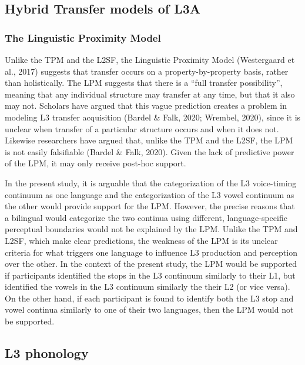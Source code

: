 \documentclass[
  man]{apa6}
\begin{document}
\hypertarget{hybrid-transfer-models-of-l3a}{%
\subsection{Hybrid Transfer models of L3A}\label{hybrid-transfer-models-of-l3a}}

\hypertarget{the-linguistic-proximity-model}{%
\subsubsection{The Linguistic Proximity Model}\label{the-linguistic-proximity-model}}

Unlike the TPM and the L2SF, the Linguistic Proximity Model (Westergaard et al., 2017) suggests that transfer occurs on a property-by-property basis, rather than holistically.
The LPM suggests that there is a ``full transfer possibility'', meaning that any individual structure may transfer at any time, but that it also may not.
Scholars have argued that this vague prediction creates a problem in modeling L3 transfer acquisition (Bardel \& Falk, 2020; Wrembel, 2020), since it is unclear when transfer of a particular structure occurs and when it does not.
Likewise researchers have argued that, unlike the TPM and the L2SF, the LPM is not easily falsifiable (Bardel \& Falk, 2020).
Given the lack of predictive power of the LPM, it may only receive post-hoc support.

In the present study, it is arguable that the categorization of the L3 voice-timing continuum as one language and the categorization of the L3 vowel continuum as the other would provide support for the LPM. However, the precise reasons that a bilingual would categorize the two continua using different, language-specific perceptual boundaries would not be explained by the LPM. Unlike the TPM and L2SF, which make clear predictions, the weakness of the LPM is its unclear criteria for what triggers one language to influence L3 production and perception over the other. In the context of the present study, the LPM would be supported if participants identified the stops in the L3 continuum similarly to their L1, but identified the vowels in the L3 continuum similarly the their L2 (or vice versa). On the other hand, if each participant is found to identify both the L3 stop and vowel continua similarly to one of their two languages, then the LPM would not be supported.

\hypertarget{l3-phonology}{%
\subsection{L3 phonology}\label{l3-phonology}}
\end{document}
